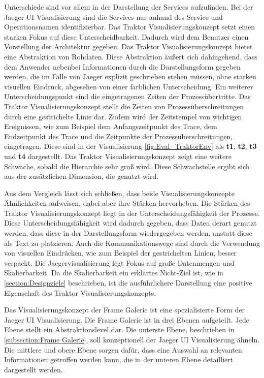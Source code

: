 Unterschiede sind vor allem in der Darstellung der Services aufzufinden. Bei der Jaeger UI Visualisierung sind die Services nur anhand des Service und Operationsnamen identifizierbar. Das Traktor Visualisierungskonzept setzt einen starken Fokus auf diese Unterscheidbarkeit. Dadurch wird dem Benutzer einen Vorstellung der Architektur gegeben. Das Traktor Visualisierungskonzept bietet eine Abstraktion von Rohdaten. Diese Abstraktion äußert sich dahingehend, dass dem Anwender nebenbei Informationen durch die Darstellungsform gegeben werden, die im Falle von Jaeger explizit geschrieben stehen müssen, ohne starken visuellen Eindruck, abgesehen von einer farblichen Unterscheidung. Ein weiterer Unterscheidungspunkt sind die eingetragenen Zeiten der Prozessübertritte. Das Traktor Visualisierungskonzept stellt die Zeiten von Prozessüberschreitungen durch eine gestrichelte Linie dar. Zudem wird der Zeitstempel von wichtigen Ereignissen, wie zum Beispiel dem Anfangszeitpunkt des Trace, dem Endzeitpunkt des Trace und die Zeitpunkte der Prozessüberschreitungen, eingetragen. Diese sind in der Visualisierung \cref{fig:Eval_TraktorEnv} als \textbf{t1}, \textbf{t2}, \textbf{t3} und \textbf{t4} dargestellt. Das Traktor Visualisierungskonzept zeigt eine weitere Schwäche, sobald die Hierarchie sehr groß wird. Diese Schwachstelle ergibt sich aus der zusätzlichen Dimension, die genutzt wird.

Aus dem Vergleich lässt sich schließen, dass beide Visualisierungskonzepte Ähnlichkeiten aufweisen, dabei aber ihre Stärken hervorheben. Die Stärken des Traktor Visualisierungskonzept liegt in der Unterscheidungsfähigkeit der Prozesse. Diese Unterscheidungsfähigkeit wird dadurch gegeben, dass Daten derart genutzt werden, dass diese in der Darstellungsform wiedergegeben werden, anstatt diese als Text zu platzieren. Auch die Kommunikationswege sind durch die Verwendung von visuellen Eindrücken, wie zum Beispiel der gestrichelten Linien, besser verpackt. Die Jaegervisualisierung legt Fokus auf große Datenmengen und Skalierbarkeit. Da die Skalierbarkeit ein erklärtes Nicht-Ziel ist, wie in \cref{section:Designziele} beschrieben, ist die ausführlichere Darstellung eine positive Eigenschaft des Traktor Visualisierungskonzepts.


Das Visualisierungskonzept der Frame Galerie ist eine spezialisierte Form der Jaeger UI Visualisierung. Die Frame Galerie ist in drei Ebenen aufgeteilt. Jede Ebene stellt ein Abstraktionslevel dar. Die unterste Ebene, beschrieben in \cref{subsection:Frame Galerie}, soll konzeptionell der Jaeger UI Visualisierung ähneln. Die mittlere und obere Ebene sorgen dafür, dass eine Auswahl an relevanten Informationen getroffen werden kann, die in der unteren Ebene detailliert dargestellt werden.

